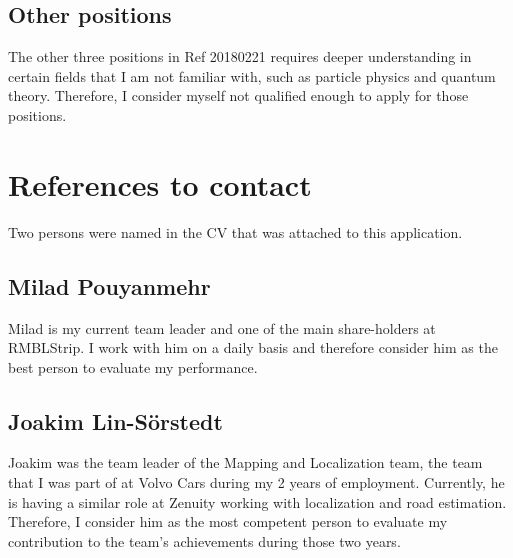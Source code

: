 \documentclass[12pt]{article}
\begin{document}
\subsection*{Other positions}
The other three positions in Ref 20180221 requires deeper understanding in certain fields that I am not familiar with, such as particle physics and quantum theory. Therefore, I consider myself not qualified enough to apply for those positions.

\section*{References to contact}
Two persons were named in the CV that was attached to this application.

\subsection*{Milad Pouyanmehr}
Milad is my current team leader and one of the main share-holders at RMBLStrip. I work with him on a daily basis and therefore consider him as the best person to evaluate my performance.

\subsection*{Joakim Lin-S\"orstedt}
Joakim was the team leader of the Mapping and Localization team, the team that I was part of at Volvo Cars during my 2 years of employment. Currently, he is having a similar role at Zenuity working with localization and road estimation. Therefore, I consider him as the most competent person to evaluate my contribution to the team's achievements during those two years.



\end{document}
